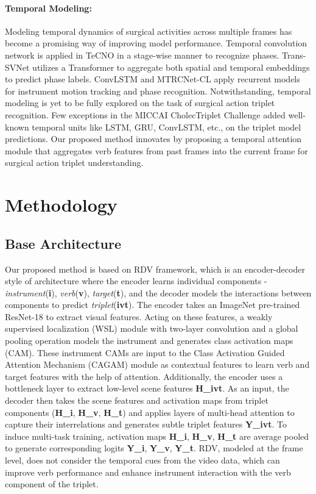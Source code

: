 \documentclass{article}
\begin{document}
\paragraph{\textbf{Temporal Modeling:}}
Modeling temporal dynamics of surgical activities across multiple frames has become a promising way of improving model performance.
Temporal convolution network is applied in TeCNO \cite{tecno} in a stage-wise manner to recognize phases. Trans-SVNet \cite{jin2022trans} utilizes a Transformer to aggregate both spatial and temporal embeddings to predict phase labels. 
ConvLSTM \cite{lstmtool} and MTRCNet-CL \cite{mtrcnetcl} apply recurrent models for instrument motion tracking and phase recognition.
Notwithstanding, temporal modeling is yet to be fully explored on the task of surgical action triplet recognition. Few exceptions in the MICCAI CholecTriplet Challenge \cite{ct50challenge2021} added well-known temporal units like LSTM, GRU, ConvLSTM, etc., on the triplet model predictions. 
Our proposed method innovates by proposing a temporal attention module that aggregates verb features from past frames into the current frame for surgical action triplet understanding.

\section{Methodology}
\subsection{Base Architecture}
Our proposed method is based on RDV \cite{rdv} framework, which is an encoder-decoder style of architecture where the encoder learns individual components - \textit{instrument}(\textbf{i}), \textit{verb}(\textbf{v}), \textit{target}(\textbf{t}), and the decoder models the interactions between components to predict \textit{triplet}(\textbf{ivt}). The encoder takes an ImageNet pre-trained ResNet-18 \cite{resnetcvpr16} to extract visual features. Acting on these features, a weakly supervised localization (WSL) module with two-layer convolution and a global pooling operation models the instrument and generates class activation maps (CAM). These instrument CAMs are input to the Class Activation Guided Attention Mechanism (CAGAM) module as contextual features to learn verb and target features with the help of attention. Additionally, the encoder uses a bottleneck layer to extract low-level scene features \textbf{H\_ivt}. As an input, the decoder then takes the scene features and activation maps from triplet components (\textbf{H\_i}, \textbf{H\_v}, \textbf{H\_t}) and applies layers of multi-head attention to capture their interrelations and generates subtle triplet features \textbf{Y\_ivt}. To induce multi-task training, activation maps \textbf{H\_i}, \textbf{H\_v}, \textbf{H\_t} are average pooled to generate corresponding logits \textbf{Y\_i}, \textbf{Y\_v}, \textbf{Y\_t}. RDV, modeled at the frame level, does not consider the temporal cues from the video data, which can improve verb performance and enhance instrument interaction with the verb component of the triplet. 
\end{document}
